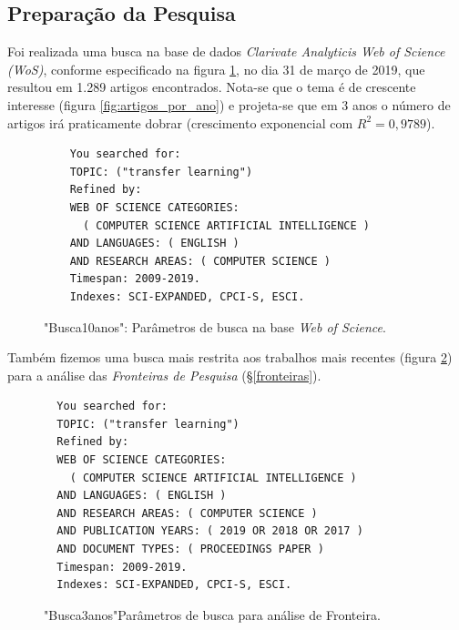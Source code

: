 \documentclass[sigconf]{acmart}
\begin{document}
\subsection{Preparação da Pesquisa}
Foi realizada uma busca na base de dados \emph{Clarivate Analyticis Web of Science (WoS)}, conforme especificado na figura \ref{card:wos}, no dia 31 de março de 2019, que resultou em 1.289 artigos encontrados. Nota-se que o tema é de crescente interesse (figura \ref{fig:artigos_por_ano}) e projeta-se que em 3 anos o número de artigos irá praticamente dobrar (crescimento exponencial com $R^2=0,9789$). 
\begin{figure}[htp]

\begin{tcolorbox}[colback=yellow!5!white,colframe=gray!75!black,title={Results: 1,289 (from Web of Science Core Collection)}]
  \footnotesize{
    \begin{verbatim}
    You searched for: 
    TOPIC: ("transfer learning")
    Refined by: 
    WEB OF SCIENCE CATEGORIES: 
      ( COMPUTER SCIENCE ARTIFICIAL INTELLIGENCE )
    AND LANGUAGES: ( ENGLISH ) 
    AND RESEARCH AREAS: ( COMPUTER SCIENCE )
    Timespan: 2009-2019. 
    Indexes: SCI-EXPANDED, CPCI-S, ESCI.
    \end{verbatim}
  }

\end{tcolorbox}
\caption{"Busca10anos": Parâmetros de busca na base \emph{Web of Science}.}
\label{card:wos}
\end{figure}

Também fizemos uma busca mais restrita aos trabalhos mais recentes (figura \ref{card:sota}) para a análise das \emph{Fronteiras de Pesquisa} (\S\ref{fronteiras}).
\begin{figure}[htp]
  \begin{tcolorbox}[colback=yellow!5!white,colframe=gray!75!black,title={Results: 384 (from Web of Science Core Collection)}]
    \footnotesize{
  \begin{verbatim}
  You searched for: 
  TOPIC: ("transfer learning")
  Refined by: 
  WEB OF SCIENCE CATEGORIES: 
    ( COMPUTER SCIENCE ARTIFICIAL INTELLIGENCE )
  AND LANGUAGES: ( ENGLISH ) 
  AND RESEARCH AREAS: ( COMPUTER SCIENCE )
  AND PUBLICATION YEARS: ( 2019 OR 2018 OR 2017 )
  AND DOCUMENT TYPES: ( PROCEEDINGS PAPER )
  Timespan: 2009-2019. 
  Indexes: SCI-EXPANDED, CPCI-S, ESCI.
  \end{verbatim}
    }
  
  \end{tcolorbox}
  \caption{"Busca3anos"Parâmetros de busca para análise de Fronteira.}
  \label{card:sota}
\end{figure}
\end{document}
